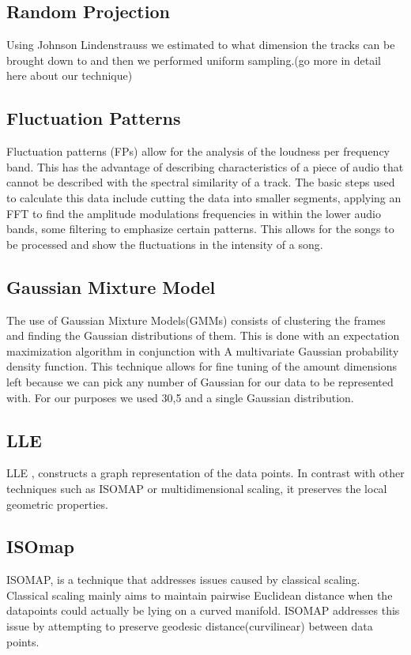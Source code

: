\documentclass[12pt]{article}
\begin{document}
\subsection{Random Projection}
 Using Johnson Lindenstrauss we estimated to what dimension the tracks can be brought down to and then we performed uniform sampling.(go more in detail here about our technique)

\subsection{Fluctuation Patterns}
Fluctuation patterns (FPs) allow for the analysis of the loudness per frequency band. This has the advantage of describing characteristics of a piece of audio that cannot be described with the spectral similarity of a track. The basic steps used to calculate this data include cutting the data into smaller segments, applying an FFT to find the amplitude modulations frequencies in within the lower audio bands, some filtering to emphasize certain patterns. This allows for the songs to be processed and show the fluctuations in the intensity of a song. %

\subsection{Gaussian Mixture Model}
The use of Gaussian Mixture Models(GMMs) consists of clustering the frames and finding the Gaussian distributions of them. This is done with an expectation maximization algorithm in conjunction with A multivariate Gaussian probability density function. This technique allows for fine tuning of the amount dimensions left because we can pick any number of Gaussian for our data to be represented with. For our purposes we used 30,5 and a single Gaussian distribution. 

\subsection{LLE}
LLE , constructs a graph representation of the data points. In contrast with other techniques such as ISOMAP or multidimensional scaling, it preserves the local geometric properties.
\subsection{ISOmap}
ISOMAP, is a technique that addresses issues caused by classical scaling. Classical scaling mainly aims to maintain pairwise Euclidean distance when the datapoints could actually be lying on a curved manifold. ISOMAP addresses this issue by attempting to preserve geodesic distance(curvilinear) between data points.
\end{document}
